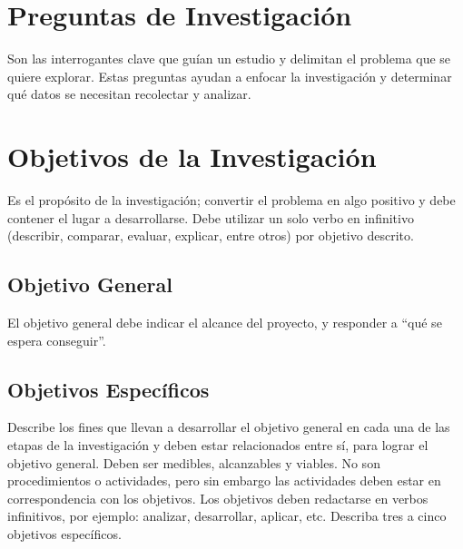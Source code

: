 \documentclass[12pt,a4paper]{article}
\begin{document}
\section{Preguntas de Investigación}
\noindent
Son las interrogantes clave que guían un estudio y delimitan el problema que se quiere explorar. Estas preguntas ayudan a enfocar la investigación y determinar qué datos se necesitan recolectar y analizar.


\section{Objetivos de la Investigación}
\noindent
Es el propósito de la investigación; convertir el problema en algo positivo y debe
contener el lugar a desarrollarse. Debe utilizar un solo verbo en infinitivo (describir,
comparar, evaluar, explicar, entre otros) por objetivo descrito.

\subsection*{Objetivo General}
\noindent
El objetivo general debe
indicar el alcance del proyecto, y responder a “qué se espera conseguir”.

\subsection*{Objetivos Específicos}
\noindent
Describe los fines que llevan a desarrollar el objetivo general en cada una de las
etapas de la investigación y deben estar relacionados entre sí, para lograr el objetivo
general. Deben ser medibles, alcanzables y viables. No son procedimientos o
actividades, pero sin embargo las actividades deben estar en correspondencia con
los objetivos. Los objetivos deben redactarse en verbos infinitivos, por ejemplo:
analizar, desarrollar, aplicar, etc. Describa tres a cinco objetivos específicos.

\end{document}
